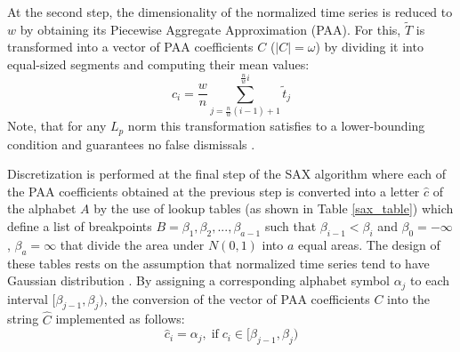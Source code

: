 At the second step, the dimensionality of the normalized time series is reduced to $w$ by obtaining its 
Piecewise Aggregate Approximation (PAA). For this, $\widetilde{T}$ is transformed into a vector of PAA coefficients $C$ ($|C|=\omega$) 
by dividing it into equal-sized segments and computing their mean values:
\begin{equation}
c_{i} = \frac{w}{n} \sum_{j=\frac{n}{w}(i-1)+1}^{\frac{n}{w}i} \widetilde{t}_{j}
\label{eq:paa}
\end{equation}
Note, that for any $L_{p}$ norm this transformation satisfies to a lower-bounding condition and guarantees no false dismissals
\cite{citeulike:2946589} \cite{citeulike:3000416}.

Discretization is performed at the final step of the SAX algorithm where each of the PAA coefficients obtained at the previous step 
is converted into a letter $\widehat{c}$ of the alphabet $A$ by the use of lookup tables (as shown in Table \ref{sax_table}) 
which define a list of breakpoints 
$B=\beta_{1}, \beta_{2}, ... , \beta_{a-1}$ such that $\beta_{i-1} < \beta_{i}$ and $\beta_{0} = -\infty$, $\beta_{a} = \infty$ 
that divide the area under $N(0,1)$ into $a$ equal areas. 
The design of these tables rests on the assumption that normalized time series tend to have Gaussian distribution \cite{citeulike:10141990} \cite{sax}.
By assigning a corresponding alphabet symbol $\alpha_{j}$ to each interval $[\beta_{j-1},\beta_{j})$, the conversion of the vector of PAA coefficients 
$C$ into the string $\widehat{C}$ implemented as follows: 
\begin{equation}
\widehat{c}_{i} = \alpha_{j}, \; \text{if} \;
{c}_{i} \in [\beta_{j-1},\beta_{j})
\label{eq:sax_alphabet}
\end{equation}

